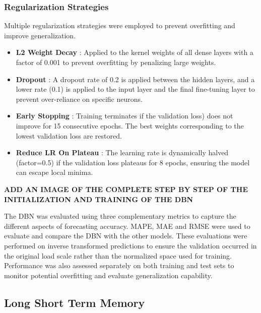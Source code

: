  \subsubsection{Regularization Strategies}
 Multiple regularization strategies were employed to prevent overfitting and improve generalization.
 
 \begin{itemize}
 	\item \textbf{L2 Weight Decay} : Applied to the kernel weights of all dense layers with a factor of 0.001 to prevent overfitting by penalizing large weights.
 	\item \textbf{Dropout} : A dropout rate of 0.2 is applied between the hidden layers, and a lower rate (0.1) is applied to the input layer and the final fine-tuning layer to prevent over-reliance on specific neurons.
 	\item \textbf{Early Stopping} : Training terminates if the validation loss) does not improve for 15 consecutive epochs. The best weights corresponding to the lowest validation loss are restored.
 	\item \textbf{Reduce LR On Plateau} : The learning rate is dynamically halved (factor=0.5) if the validation loss plateaus for 8 epochs, ensuring the model can escape local minima.
 \end{itemize}
 
 \textbf{ ADD AN IMAGE OF THE COMPLETE STEP BY STEP OF THE INITIALIZATION AND TRAINING OF THE DBN}
 
 
 The DBN was evaluated using three complementary metrics to capture the different aspects of forecasting accuracy. MAPE, MAE and RMSE were used to evaluate and compare the DBN with the other models. These evaluations were performed on inverse transformed predictions to ensure the validation occurred in the original load scale rather than the normalized space used for training. Performance was also assessed separately on both training and test sets to monitor potential overfitting and evaluate generalization capability.
 
 
 
 \subsection{Long Short Term Memory}